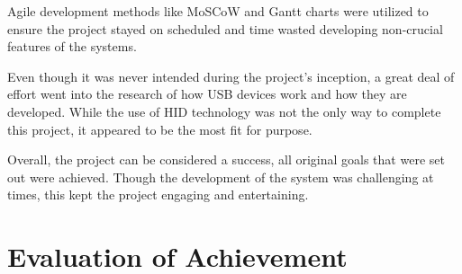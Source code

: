 \documentclass{article}
\begin{document}
		Agile development methods like MoSCoW and Gantt charts were utilized to ensure the project stayed on scheduled and time wasted developing non-crucial features of the systems. 
		
		Even though it was never intended during the project's inception, a great deal of effort went into the research of how USB devices work and how they are developed. While the use of HID technology was not the only way to complete this project, it appeared to be the most fit for purpose.
		
		Overall, the project can be considered a success, all original goals that were set out
		were achieved. Though the development of the system was challenging at times, this kept the project engaging and entertaining. 
		
	\section{Evaluation of Achievement}
		\lipsum[6]
				
	
	
	
			
	\newpage	
		
			
	
	
	

	\newpage
\end{document}
